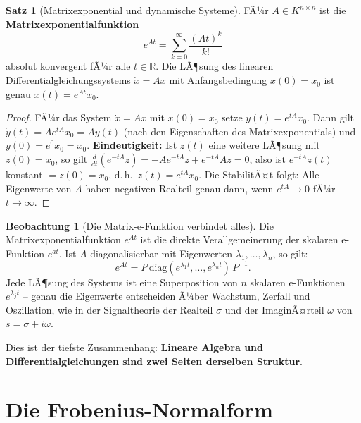 ﻿\documentclass[a4paper,12pt]{report}
\theoremstyle{definition}
\newtheorem{satz}{Satz}
\newtheorem{beobachtung}{Beobachtung}
\begin{document}
\begin{satz}[Matrixexponential und dynamische Systeme]
    FÃ¼r $A \in K^{n \times n}$ ist die \textbf{Matrixexponentialfunktion}
    \[
        e^{At} = \sum_{k=0}^{\infty} \frac{(At)^k}{k!}
    \]
    absolut konvergent fÃ¼r alle $t \in \mathbb{R}$. Die LÃ¶sung des linearen
    Differentialgleichungssystems $\dot{x} = Ax$ mit Anfangsbedingung $x(0) = x_0$
    ist genau $x(t) = e^{At} x_0$.
\end{satz}
\begin{proof}
    FÃ¼r das System $\dot{x} = Ax$ mit $x(0) = x_0$ setze $y(t) = e^{tA} x_0$.
    Dann gilt $\dot{y}(t) = A e^{tA} x_0 = A y(t)$ (nach den Eigenschaften
    des Matrixexponentials) und $y(0) = e^0 x_0 = x_0$.
    \textbf{Eindeutigkeit:} Ist $z(t)$ eine weitere LÃ¶sung mit $z(0) = x_0$,
    so gilt $\frac{d}{dt}(e^{-tA} z) = -A e^{-tA} z + e^{-tA} Az = 0$,
    also ist $e^{-tA} z(t)$ konstant $= z(0) = x_0$, d.\,h.\ $z(t) = e^{tA} x_0$.
    Die StabilitÃ¤t folgt: Alle Eigenwerte von $A$ haben negativen Realteil
    genau dann, wenn $e^{tA} \to 0$ fÃ¼r $t \to \infty$.
\end{proof}


\begin{beobachtung}[Die Matrix-e-Funktion verbindet alles]
    Die Matrixexponentialfunktion $e^{At}$ ist die direkte Verallgemeinerung
    der skalaren e-Funktion $e^{at}$. Ist $A$ diagonalisierbar mit Eigenwerten
    $\lambda_1, \dots, \lambda_n$, so gilt:
    \[
        e^{At} = P \,\mathrm{diag}(e^{\lambda_1 t}, \dots, e^{\lambda_n t})\, P^{-1}.
    \]
    Jede LÃ¶sung des Systems ist eine Superposition von $n$ skalaren
    e-Funktionen $e^{\lambda_j t}$ -- genau die Eigenwerte entscheiden
    Ã¼ber Wachstum, Zerfall und Oszillation, wie in der Signaltheorie der
    Realteil $\sigma$ und der ImaginÃ¤rteil $\omega$ von $s = \sigma + i\omega$.

    Dies ist der tiefste Zusammenhang: \textbf{Lineare Algebra und
    Differentialgleichungen sind zwei Seiten derselben Struktur}.
\end{beobachtung}


\section{Die Frobenius-Normalform}
\end{document}
